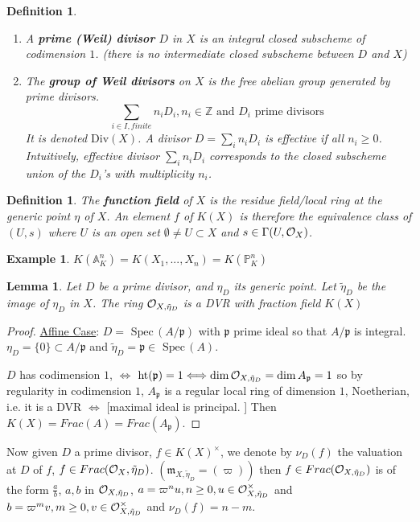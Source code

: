 \documentclass[11pt]{article}
\newtheorem{lemma}[thm]{Lemma}
\newtheorem{dfn}[thm]{Definition}
\newtheorem{ex}[thm]{Example}
\newcommand{\spec}{\text{ Spec}\,}
\newcommand{\affn}{\mathbb A}
\newcommand{\proj}{\mathbb P}
\newcommand{\intg}{\mathbb Z}
\newcommand{\scm}{{\mathfrak m}}
\newcommand{\scp}{{\mathfrak p}}
\newcommand{\calo}{{\cal O}}
\newcommand{\Llrta}{\Longleftrightarrow}
\begin{document}
\begin{dfn}
\ \begin{enumerate}[label=(\arabic*)]
\item  A \textbf{prime (Weil) divisor} $D$ in $X$ is an integral closed subscheme of codimension $1$. (there is no intermediate closed subscheme between $D$ and $X$)
\item The \textbf{group of Weil divisors} on $X$ is the free abelian group generated by  prime divisors.
$$
\sum_{i\in I, finite} n_i D_i
, n_i\in \intg\text{ and } D_i \text{ prime divisors }
$$
It is denoted $\text{Div}(X)$. A divisor $D=\sum_i n_i D_i$ is effective if all $n_i\geq 0$. Intuitively, effective divisor $\sum_i n_i D_i$ corresponds to the closed subscheme union of the $D_i$'s with multiplicity $n_i$.
\end{enumerate}
\end{dfn}
\begin{dfn}
The \textbf{function field} of $X$ is the residue field/local ring at the generic point $\eta$ of $X$. An element $f$ of $K(X)$ is therefore the equivalence class of $(U,s)$ where $U$ is 
an open set $\emptyset \neq U\subset X$ and $s\in \Gamma(U,\calo_X)$.
\end{dfn}
\begin{ex}
$K(\affn^n_K)=K(X_1,...,X_n)=K(\proj^n_K)$
\end{ex}
\begin{lemma}
Let $D$ be a prime divisor, and $\eta_D$ its generic point. Let $\tilde{\eta}_D$ be the image of $\eta_D$ in $X$. The ring 
$\calo_{X,\tilde{\eta}_D}$ is a DVR with fraction field $K(X)$
\end{lemma}
\begin{proof}
\underline{Affine Case}: $D=\spec(A/\scp)$ with $\scp$ prime ideal so that $A/\scp$ is integral. $\eta_D=\{0\}\subset A/\scp$ and $\tilde{\eta}_D=\scp\in \spec(A)$.

$D$ has codimension $1$, $\Llrta$ $\text{ht}(\scp)=1\Llrta \dim \calo_{X,\tilde{\eta}_D}=\dim A_\scp=1$ so by regularity in codimension $1$, $A_\scp$ is a regular local ring of dimension $1$, Noetherian, i.e. it is a DVR $\Llrta $ [maximal ideal is principal. ] Then $K(X)=Frac(A)=Frac(A_\scp)$. 
\end{proof}

Now given $D$ a prime divisor, $f\in K(X)^{\times}$, we denote by $\nu_D(f)$ the valuation at $D$ of $f$, $f\in Frac(\calo_X,\tilde{\eta}_D)$. $(\scm_{X,\tilde{\eta}_D} =(\varpi))$ then $f\in Frac(\calo_{X,\tilde{\eta}_D})$ is of the form $\frac{a}{b}$, $a, b$ in $\calo_{X,\tilde{\eta}_D}$, 
$a=\varpi^n u, n\geq 0, u\in\calo_{X,\tilde{\eta}_D}^\times$ and $b=\varpi^m v, m \geq 0, v\in\calo_{X,\tilde{\eta}_D}^\times$ and $\nu_D(f)=n-m$.
\end{document}
